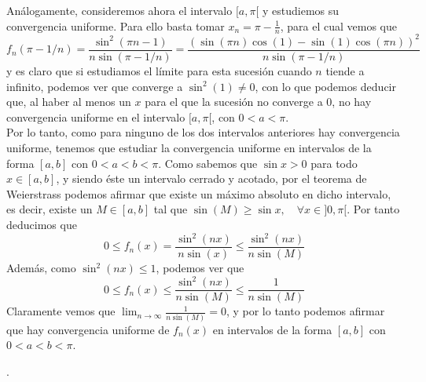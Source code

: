 \documentclass[fleqn]{article}
\begin{document}
Análogamente, consideremos ahora el intervalo $[a, \pi[$ y estudiemos su convergencia uniforme. Para ello basta tomar $x_n=\pi - \frac{1}{n}$,
para el cual vemos que 
$$f_n(\pi-1/n) = \frac{\sin^2(\pi n-1)}{n \sin(\pi - 1/n)} = \frac{(\sin(\pi n)\cos(1)-\sin(1)\cos(\pi n))^2}{n \sin(\pi - 1/n)}$$
y es claro que si estudiamos el límite para esta sucesión cuando $n$ tiende a infinito, podemos ver que converge a $\sin^2(1) \neq 0$, 
con lo que podemos deducir que, al haber al menos un $x$ para el que la sucesión no converge a $0$, no hay convergencia uniforme en 
el intervalo $[a, \pi[$, con $0 < a < \pi$.\\

Por lo tanto, como para ninguno de los dos intervalos anteriores hay convergencia uniforme, tenemos que estudiar la convergencia uniforme
en intervalos de la forma $[a,b]$ con $0 < a < b < \pi$. Como sabemos que $\sin x >0$ para todo $x\in[a,b]$, y siendo éste un intervalo 
cerrado y acotado, por el teorema de Weierstrass podemos afirmar que existe un máximo absoluto en dicho intervalo, es decir,
existe un $M\in[a,b]$ tal que $\sin (M) \geq \sin x, \quad \forall x\in ]0,\pi[$. Por tanto deducimos que
$$0 \leq f_n(x) = \frac{\sin^2(nx)}{n \sin(x)} \leq \frac{\sin^2(nx)}{n \sin(M)}$$
Además, como $\sin^2(nx) \leq 1$, podemos ver que
$$0 \leq f_n(x) \leq \frac{\sin^2(nx)}{n \sin(M)} \leq \frac{1}{n \sin(M)}$$
Claramente vemos que $\lim_{n\rightarrow \infty} \frac{1}{n \sin(M)} = 0$, y por lo tanto podemos afirmar que hay convergencia uniforme de
$f_n(x)$ en intervalos de la forma $[a,b]$ con $0 < a < b < \pi$.

\begin{comment}
    Como la función $f(x)$ es constante nula, estudiamos por ello los extremos relativos de la función $f_n(x)$ mediante su derivada, 
    con $f_n'(x)=0$
    $$f_n'(x) = \frac{2n\sin(nx)\cos(nx)\sin(x) - \sin^2(nx)\cos(x)}{n\sin^2(x)}$$
    Estudiamos sus puntos de derivada nula, y obtenemos la ecuación
    $$2n\sin(nx)\cos(nx)\sin(x) = \sin^2(nx)\cos(x) \Rightarrow \tan(nx)=2n\tan(x)$$
    Vemos por tanto que los extremos relativos no se pueden calcular de manera directa
\end{comment}


.\\ \\
\end{document}
